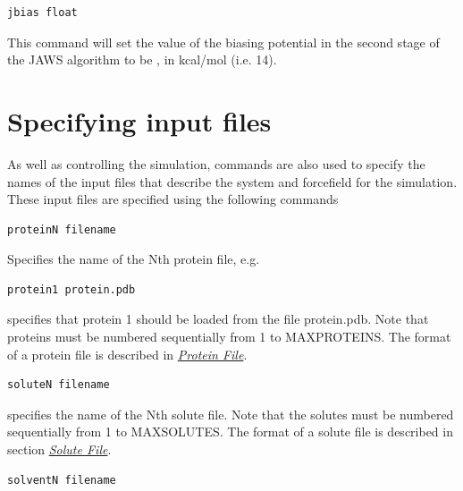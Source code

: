 \documentclass[letterpaper,10pt,english]{sphinxmanual}
\begin{document}
\begin{Verbatim}[frame=single,commandchars=\\\{\}]
jbias float
\end{Verbatim}

This command will set the value of the biasing potential in the second stage of the JAWS algorithm to be , in kcal/mol (i.e. 14).


\section{Specifying input files}
\label{protoms:specifying-input-files}\label{protoms:incmd}
As well as controlling the simulation, commands are also used to specify the names of the input files that describe the system and forcefield for the simulation. These input files are specified using the following commands

\begin{Verbatim}[frame=single,commandchars=\\\{\}]
proteinN filename
\end{Verbatim}

Specifies the name of the Nth protein file, e.g.

\begin{Verbatim}[frame=single,commandchars=\\\{\}]
protein1 protein.pdb
\end{Verbatim}

specifies that protein 1 should be loaded from the file protein.pdb. Note that proteins must be numbered sequentially from 1 to MAXPROTEINS. The format of a protein file is described in {\hyperref[protoms:protpdb]{\emph{Protein File}}}.

\begin{Verbatim}[frame=single,commandchars=\\\{\}]
soluteN filename
\end{Verbatim}

specifies the name of the Nth solute file. Note that the solutes must be numbered sequentially from 1 to MAXSOLUTES. The format of a solute file is described in section {\hyperref[protoms:solpdb]{\emph{Solute File}}}.

\begin{Verbatim}[frame=single,commandchars=\\\{\}]
solventN filename
\end{Verbatim}
\end{document}
